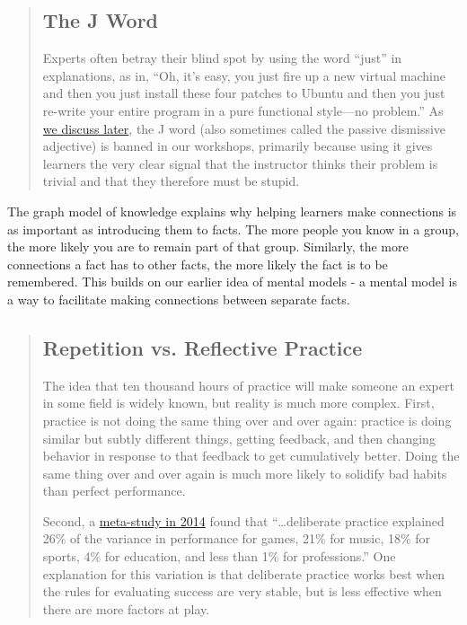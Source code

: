 \begin{quotation}   %
\subsection*{The J Word}

Experts often betray their blind spot by using the word ``just'' in explanations,
as in, ``Oh, it's easy, you just fire up a new virtual machine
and then you just install these four patches to Ubuntu
and then you just re-write your entire program in a pure functional style---no problem.''
As \href{\{\{ page.root \}\}/19-motivation/}{we discuss later},
the J word (also sometimes called the passive dismissive adjective)
is banned in our workshops,
primarily because using it gives learners the very clear signal
that the instructor thinks their problem is trivial
and that they therefore must be stupid.
\end{quotation}   %

The graph model of knowledge explains why
helping learners make connections is as important as introducing them to facts.
The more people you know in a group,
the more likely you are to remain part of that group.
Similarly,
the more connections a fact has to other facts,
the more likely the fact is to be remembered.  This builds on our earlier idea
of mental models - a mental model is a way to facilitate making connections between
separate facts.

\begin{quotation}   %
\subsection*{Repetition vs. Reflective Practice}

The idea that ten thousand hours of practice will make someone an expert in some field
is widely known,
but reality is much more complex.
First,
practice is not doing the same thing over and over again:
practice is doing similar but subtly different things,
getting feedback,
and then changing behavior in response to that feedback to get cumulatively better.
Doing the same thing over and over again is much more likely to solidify bad habits than perfect performance.

Second,
a \href{http://pss.sagepub.com/content/25/8/1608}{meta-study in 2014} found that
``\ldots{}deliberate practice explained 26\% of the variance in performance for games,
21\% for music, 18\% for sports, 4\% for education, and less than 1\% for professions.''
One explanation for this variation is that
deliberate practice works best when the rules for evaluating success are very stable,
but is less effective when there are more factors at play.
\end{quotation}   %

